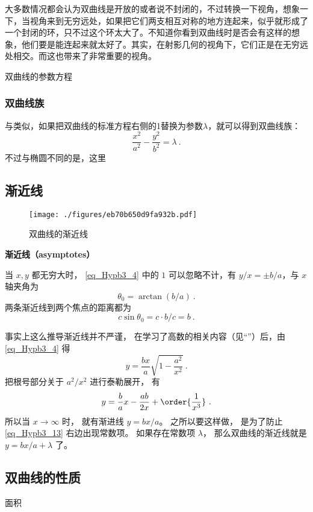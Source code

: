 大多数情况都会认为双曲线是开放的或者说不封闭的，不过转换一下视角，想象一下，当视角来到无穷远处，如果把它们两支相互对称的地方连起来，似乎就形成了一个封闭的环，只不过这个环太大了。不知道你看到双曲线时是否会有这样的想象，他们要是能连起来就太好了。其实，在射影几何的视角下，它们正是在无穷远处相交。而这也带来了非常重要的视角。

\begin{theorem}{双曲线的参数方程}

\end{theorem}
\subsubsection{双曲线族}
与类似，如果把双曲线的标准方程右侧的1替换为参数$\lambda$，就可以得到双曲线族：
\begin{equation}
\frac{x^2}{a^2} - \frac{y^2}{b^2} = \lambda~.
\end{equation}
不过与椭圆不同的是，这里
\subsection{渐近线}
\begin{figure}[ht]
\centering
\texttt{[image: ./figures/eb70b650d9fa932b.pdf]}
\caption{双曲线的渐近线} \label{fig_Hypb3_1}
\end{figure}
\textbf{渐近线（asymptotes）}

当 $x,y$ 都无穷大时， \autoref{eq_Hypb3_4} 中的 $1$ 可以忽略不计，有 $y/x = \pm b/a$，与 $x$ 轴夹角为
\begin{equation}\label{eq_Hypb3_1}
\theta_0 = \arctan(b/a)~.
\end{equation}
两条渐近线到两个焦点的距离都为
\begin{equation}\label{eq_Hypb3_11}
c\sin\theta_0 = c\cdot b/c = b~.
\end{equation}


事实上这么推导渐近线并不严谨， 在学习了高数的相关内容（见“”）后，由\autoref{eq_Hypb3_4} 得
\begin{equation}
y = \frac{bx}{a} \sqrt{1-\frac{a^2}{x^2}}~.
\end{equation}
把根号部分关于 $a^2/x^2$ 进行泰勒展开， 有
\begin{equation}\label{eq_Hypb3_13}
y = \frac ba x - \frac{ab}{2x} + \order{\frac{1}{x^3}}~.
\end{equation}
所以当 $x\to\infty$ 时， 就有渐进线 $y = bx/a$。 之所以要这样做， 是为了防止\autoref{eq_Hypb3_13} 右边出现常数项。 如果存在常数项 $\lambda$， 那么双曲线的渐近线就是 $y = bx/a + \lambda$ 了。

\subsection{双曲线的性质}
面积









